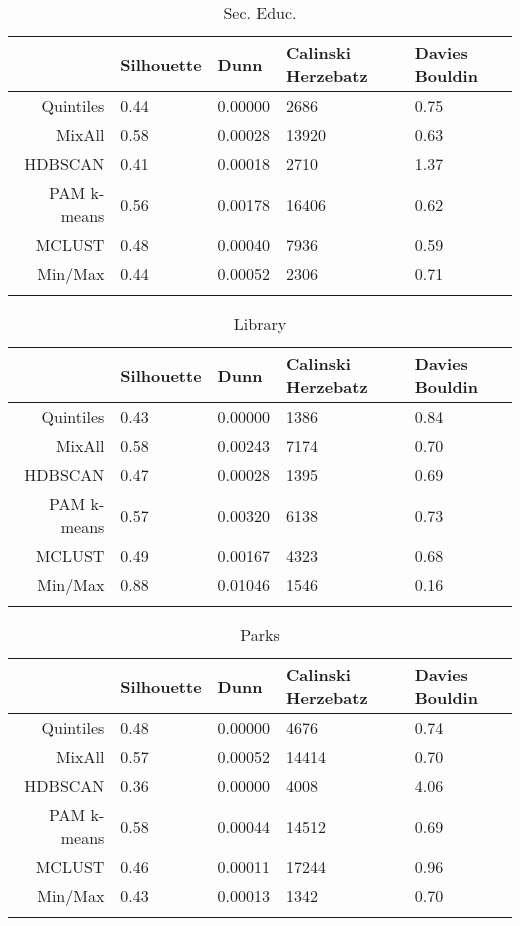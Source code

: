 \documentclass[10pt, a4paper]{article}
\begin{document}
 \pagebreak 
 
\begin{longtable}{rllll}
  \hline
 & Silhouette & Dunn & Calinski Herzebatz & Davies Bouldin \\ 
  \hline
Quintiles & 0.44 & 0.00000 &  2686 & 0.75 \\ 
   \hline
MixAll & 0.58 & 0.00028 & 13920 & 0.63 \\ 
   \hline
HDBSCAN & 0.41 & 0.00018 &  2710 & 1.37 \\ 
   \hline
PAM k-means & 0.56 & 0.00178 & 16406 & 0.62 \\ 
   \hline
MCLUST & 0.48 & 0.00040 &  7936 & 0.59 \\ 
   \hline
Min/Max & 0.44 & 0.00052 &  2306 & 0.71 \\ 
   \hline
\hline
\caption{Sec. Educ.} 
\end{longtable}





 \pagebreak 
 
\begin{longtable}{rllll}
  \hline
 & Silhouette & Dunn & Calinski Herzebatz & Davies Bouldin \\ 
  \hline
Quintiles & 0.43 & 0.00000 & 1386 & 0.84 \\ 
   \hline
MixAll & 0.58 & 0.00243 & 7174 & 0.70 \\ 
   \hline
HDBSCAN & 0.47 & 0.00028 & 1395 & 0.69 \\ 
   \hline
PAM k-means & 0.57 & 0.00320 & 6138 & 0.73 \\ 
   \hline
MCLUST & 0.49 & 0.00167 & 4323 & 0.68 \\ 
   \hline
Min/Max & 0.88 & 0.01046 & 1546 & 0.16 \\ 
   \hline
\hline
\caption{Library} 
\end{longtable}





 \pagebreak 
 
\begin{longtable}{rllll}
  \hline
 & Silhouette & Dunn & Calinski Herzebatz & Davies Bouldin \\ 
  \hline
Quintiles & 0.48 & 0.00000 &  4676 & 0.74 \\ 
   \hline
MixAll & 0.57 & 0.00052 & 14414 & 0.70 \\ 
   \hline
HDBSCAN & 0.36 & 0.00000 &  4008 & 4.06 \\ 
   \hline
PAM k-means & 0.58 & 0.00044 & 14512 & 0.69 \\ 
   \hline
MCLUST & 0.46 & 0.00011 & 17244 & 0.96 \\ 
   \hline
Min/Max & 0.43 & 0.00013 &  1342 & 0.70 \\ 
   \hline
\hline
\caption{Parks} 
\end{longtable}
\end{document}
